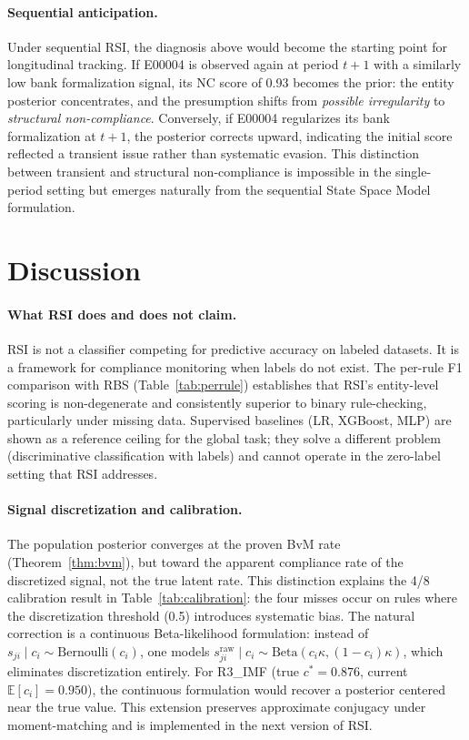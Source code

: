 \documentclass[letterpaper]{article}
\begin{document}
\paragraph{Sequential anticipation.}
Under sequential RSI, the diagnosis above would become the starting
point for longitudinal tracking. If E00004 is observed again at period
$t{+}1$ with a similarly low bank formalization signal, its NC score
of 0.93 becomes the prior: the entity posterior concentrates, and the
presumption shifts from \emph{possible irregularity} to
\emph{structural non-compliance}. Conversely, if E00004 regularizes
its bank formalization at $t{+}1$, the posterior corrects upward,
indicating the initial score reflected a transient issue rather than
systematic evasion. This distinction between transient and structural
non-compliance is impossible in the single-period setting but emerges
naturally from the sequential State Space Model formulation.

\section{Discussion}
\label{sec:discussion}

\paragraph{What RSI does and does not claim.}
RSI is not a classifier competing for predictive accuracy on labeled
datasets. It is a framework for compliance monitoring when labels do
not exist. The per-rule F1 comparison with RBS (Table~\ref{tab:perrule})
establishes that RSI's entity-level scoring is non-degenerate and
consistently superior to binary rule-checking, particularly
under missing data. Supervised baselines (LR, XGBoost, MLP) are shown as
a reference ceiling for the global task; they solve a different problem
(discriminative classification with labels) and cannot operate in the
zero-label setting that RSI addresses.

\paragraph{Signal discretization and calibration.}
The population posterior converges at the proven BvM rate
(Theorem~\ref{thm:bvm}), but toward the apparent compliance rate of
the discretized signal, not the true latent rate. This distinction
explains the 4/8 calibration result in Table~\ref{tab:calibration}:
the four misses occur on rules where the discretization threshold
(0.5) introduces systematic bias. The natural correction is a
continuous Beta-likelihood formulation: instead of
$s_{ji} \mid c_i \sim \mathrm{Bernoulli}(c_i)$, one models
$s_{ji}^{\mathrm{raw}} \mid c_i \sim \mathrm{Beta}(c_i \kappa,
(1{-}c_i)\kappa)$, which eliminates discretization entirely. For
R3\_IMF (true $c^* = 0.876$, current $\mathbb{E}[c_i] = 0.950$),
the continuous formulation would recover a posterior centered near
the true value. This extension preserves approximate conjugacy under
moment-matching and is implemented in the next version of RSI.
\end{document}
